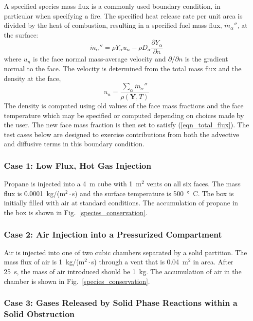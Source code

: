 \documentclass[11pt]{book}
\begin{document}
A specified species mass flux is a commonly used boundary condition, in particular when specifying a fire.  The specified heat release rate per unit area is divided by the heat of combustion, resulting in a specified fuel mass flux, $\dot{m}_\alpha''$, at the surface:
\begin{equation}
\label{eqn_total_flux}
\dot{m}_{\alpha}'' = \rho Y_{\alpha} u_n - \rho D_\alpha \frac{\partial Y_\alpha}{\partial n}
\end{equation}
where $u_n$ is the face normal mass-average velocity and $\partial/\partial n$ is the gradient normal to the face.  The velocity is determined from the total mass flux and the density at the face,
\begin{equation}
\label{eqn_un}
u_n = \frac{\sum_\alpha \dot{m}_\alpha''}{\rho(\mathbf{Y},T)}
\end{equation}
The density is computed using old values of the face mass fractions and the face temperature which may be specified or computed depending on choices made by the user.  The new face mass fraction is then set to satisfy (\ref{eqn_total_flux}).  The test cases below are designed to exercise contributions from both the advective and diffusive terms in this boundary condition.

\subsubsection{Case 1: Low Flux, Hot Gas Injection}

Propane is injected into a 4~m cube with 1~m$^2$ vents on all six faces.  The mass flux is 0.0001~kg/(m$^2\cdot$s) and the surface temperature is 500~\si{\degree C}.  The box is initially filled with air at standard conditions.  The accumulation of propane in the box is shown in Fig.~\ref{species_conservation}.

\subsubsection{Case 2: Air Injection into a Pressurized Compartment}

Air is injected into one of two cubic chambers separated by a solid partition.  The mass flux of air is 1~kg/(m$^2\cdot$s) through a vent that is 0.04~m$^2$ in area. After 25~s, the mass of air introduced should be 1~kg. The accumulation of air in the chamber is shown in Fig.~\ref{species_conservation}.

\subsubsection{Case 3: Gases Released by Solid Phase Reactions within a Solid Obstruction}
\end{document}
